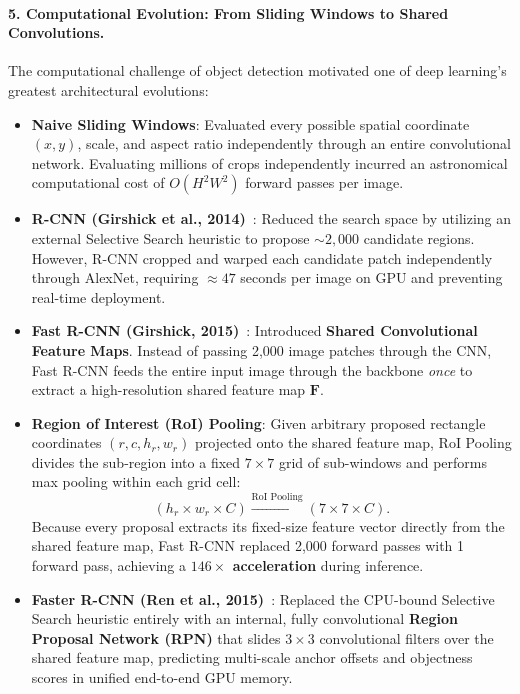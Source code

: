 \paragraph{5. Computational Evolution: From Sliding Windows to Shared Convolutions.}
The computational challenge of object detection motivated one of deep learning's greatest architectural evolutions:
\begin{itemize}[leftmargin=*]
  \item \textbf{Naive Sliding Windows}: Evaluated every possible spatial coordinate $(x, y)$, scale, and aspect ratio independently through an entire convolutional network. Evaluating millions of crops independently incurred an astronomical computational cost of $O(H^2 W^2)$ forward passes per image.
  \item \textbf{R-CNN (Girshick et al., 2014)}~\cite{girshick2014rich}: Reduced the search space by utilizing an external Selective Search heuristic to propose $\sim 2,000$ candidate regions. However, R-CNN cropped and warped each candidate patch independently through AlexNet, requiring $\approx 47$ seconds per image on GPU and preventing real-time deployment.
  \item \textbf{Fast R-CNN (Girshick, 2015)}~\cite{girshick2015fast}: Introduced \textbf{Shared Convolutional Feature Maps}. Instead of passing 2,000 image patches through the CNN, Fast R-CNN feeds the entire input image through the backbone \textit{once} to extract a high-resolution shared feature map $\mathbf{F}$.
  \item \textbf{Region of Interest (RoI) Pooling}: Given arbitrary proposed rectangle coordinates $(r, c, h_r, w_r)$ projected onto the shared feature map, RoI Pooling divides the sub-region into a fixed $7 \times 7$ grid of sub-windows and performs max pooling within each grid cell:
    \begin{equation}
    (h_r \times w_r \times C) \xrightarrow{\text{RoI Pooling}} (7 \times 7 \times C).
    \label{eq:roi_pooling_mapping}
    \end{equation}
    Because every proposal extracts its fixed-size feature vector directly from the shared feature map, Fast R-CNN replaced 2,000 forward passes with 1 forward pass, achieving a \textbf{$146\times$ acceleration} during inference.
  \item \textbf{Faster R-CNN (Ren et al., 2015)}~\cite{ren2015faster}: Replaced the CPU-bound Selective Search heuristic entirely with an internal, fully convolutional \textbf{Region Proposal Network (RPN)} that slides $3 \times 3$ convolutional filters over the shared feature map, predicting multi-scale anchor offsets and objectness scores in unified end-to-end GPU memory.
\end{itemize}

